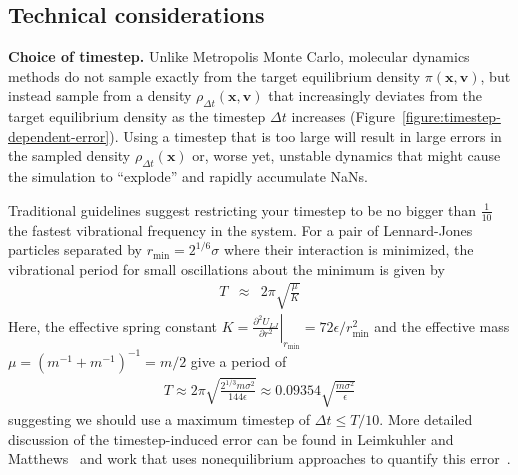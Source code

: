 \documentclass[aip,jcp,preprint,superscriptaddress,floatfix]{revtex4-1}
\newcommand{\x}{\mathbf{x}}
\newcommand{\vel}{\mathbf{v}}
\begin{document}
\subsection{Technical considerations}


\textbf{Choice of timestep.} 
Unlike Metropolis Monte Carlo, molecular dynamics methods do not sample exactly from the target equilibrium density $\pi(\x,\vel)$, but instead sample from a density $\rho_{\Delta t}(\x,\vel)$ that increasingly deviates from the target equilibrium density as the timestep $\Delta t$ increases (Figure~\ref{figure:timestep-dependent-error}).
Using a timestep that is too large will result in large errors in the sampled density $\rho_{\Delta t}(\x)$ or, worse yet, unstable dynamics that might cause the simulation to ``explode''  and rapidly accumulate NaNs.

Traditional guidelines suggest restricting your timestep to be no bigger than $\frac{1}{10}$ the fastest vibrational frequency in the system.
For a pair of Lennard-Jones particles separated by $r_\mathrm{min} = 2^{1/6} \sigma$ where their interaction is minimized, the vibrational period for small oscillations about the minimum is given by
\begin{eqnarray}
T &\approx& 2 \pi \sqrt{ \frac{\mu}{K} } 
\end{eqnarray}
Here, the effective spring constant $K = \left. \frac{\partial^2 U_{LJ}}{\partial r^2} \right|_{r_\mathrm{min}} = 72 \epsilon / r_\mathrm{min}^2$ and the effective mass $\mu = (m^{-1} + m^{-1})^{-1} = m/2$ give a period of 
\begin{eqnarray}
T \approx 2 \pi \sqrt{\frac{2^{1/3} m \sigma^2}{144 \epsilon}} \approx 0.09354 \sqrt{\frac{m \sigma^2}{\epsilon}}
\end{eqnarray}
suggesting we should use a maximum timestep of $\Delta t \le T/10$.
More detailed discussion of the timestep-induced error can be found in Leimkuhler and Matthews~\cite{LeimkuhlerMatthewsBook} and work that uses nonequilibrium approaches to quantify this error~\cite{VVVR}.
\end{document}
